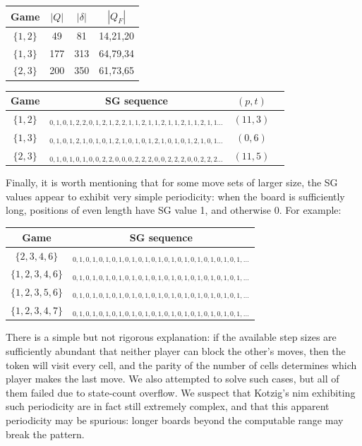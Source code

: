 \documentclass[11pt]{article}
\theoremstyle{definition}
\theoremstyle{plain}
\begin{document}
\begin{center}
    \begin{tabular}{|c|c|c|c|}
        \hline
        Game & $|Q|$ & $|\delta|$ & $|Q_F|$\\
        \hline
        $\{1,2\}$ & 49  & 81  & 14,21,20 \\
        $\{1,3\}$ & 177 & 313 & 64,79,34 \\
        $\{2,3\}$ & 200 & 350 & 61,73,65 \\
        \hline
    \end{tabular}
\end{center}

\begin{center}
    \small
    \begin{tabular}{|c|c|c|c|}
        \hline
        Game & SG sequence & $(p, t)$ \\
        \hline
        $\{1,2\}$ & ${}_{0,1,0,1,2,2,0,1,2,1,2,2,1,1,2,1,1,2,1,1,2,1,1,2,1,1\ldots}$ & $(11,3)$ \\
        $\{1,3\}$ & ${}_{0,1,0,1,2,1,0,1,0,1,2,1,0,1,0,1,2,1,0,1,0,1,2,1,0,1\ldots}$ & $(0,6)$ \\
        $\{2,3\}$ & ${}_{0,1,0,1,0,1,0,0,2,2,0,0,0,2,2,2,0,0,2,2,2,0,0,2,2,2\ldots}$ & $(11,5)$ \\
        \hline
   \end{tabular}
    \normalsize
\end{center}

Finally, it is worth mentioning that for some move sets of larger size, the SG values appear to exhibit very simple periodicity:
when the board is sufficiently long, positions of even length have SG value 1, and otherwise 0. For example:
\begin{center}
    \begin{tabular}{|c|c|}
        \hline
        Game & SG sequence\\
        \hline
        $\{2,3,4,6\}$    & ${}_{0,1,0,1,0,1,0,1,0,1,0,1,0,1,0,1,0,1,0,1,0,1,0,1,0,1,\ldots}$ \\
        $\{1,2,3,4,6\}$  & ${}_{0,1,0,1,0,1,0,1,0,1,0,1,0,1,0,1,0,1,0,1,0,1,0,1,0,1,\ldots}$ \\
        $\{1,2,3,5,6\}$  & ${}_{0,1,0,1,0,1,0,1,0,1,0,1,0,1,0,1,0,1,0,1,0,1,0,1,0,1,\ldots}$ \\
        $\{1,2,3,4,7\}$  & ${}_{0,1,0,1,0,1,0,1,0,1,0,1,0,1,0,1,0,1,0,1,0,1,0,1,0,1,\ldots}$ \\
        \hline
    \end{tabular}
\end{center}
There is a simple but not rigorous explanation: if the available step sizes are sufficiently abundant that neither player can block the other's moves, then the token will visit every cell, and the parity of the number of cells determines which player makes the last move.
We also attempted to solve such cases, but all of them failed due to state-count overflow.
We suspect that Kotzig's nim exhibiting such periodicity are in fact still extremely complex, and that this apparent periodicity may be spurious: longer boards beyond the computable range may break the pattern.
\end{document}
